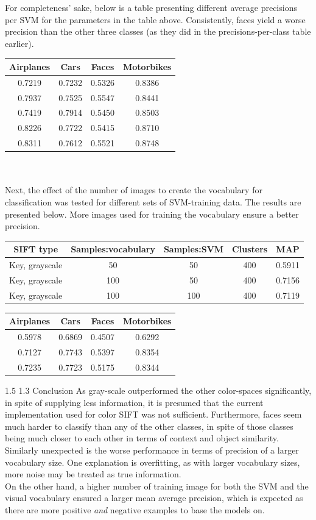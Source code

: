 \documentclass[12pt,a4paper]{amsart}
\makeatletter
\def\section{%
  \@startsection{section}{1}{\z@}%
  {1.5\linespacing\@plus\linespacing}%
  {1.3\linespacing}%
  {\bfseries\normalfont\scshape}
}
\makeatother
\begin{document}
For completeness' sake, below is a table presenting different average precisions per SVM for the parameters in the table above. Consistently, faces yield a worse precision than the other three classes (as they did in the precisions-per-class table earlier).\\
\begin{tabular}{|cccc|}
\hline
Airplanes & Cars & Faces & Motorbikes\\
\toprule
0.7219&0.7232&0.5326&0.8386\\
0.7937&0.7525&0.5547&0.8441 \\
0.7419&0.7914&0.5450&0.8503\\
0.8226&0.7722&0.5415&0.8710\\
0.8311&0.7612&0.5521&0.8748\\
\hline
\end{tabular}
\\\\Next, the effect of the number of images to create the vocabulary for classification was tested for different sets of SVM-training data. The results are presented below. More images used for training the vocabulary ensure a better precision.
\begin{tabular}{|ccccc|}
\hline
SIFT type & Samples:vocabulary & Samples:SVM & Clusters & MAP\\
\toprule
Key, grayscale & 50 & 50 & 400 & 0.5911 \\
Key, grayscale & 100 & 50 & 400 & 0.7156 \\
Key, grayscale & 100 & 100 & 400 & 0.7119 \\
\hline
\end{tabular}

\begin{tabular}{|cccc|}
\hline
Airplanes & Cars & Faces & Motorbikes\\
\toprule
0.5978&0.6869&0.4507&0.6292\\
0.7127& 0.7743& 0.5397 & 0.8354\\
0.7235 & 0.7723& 0.5175 & 0.8344\\
\hline
\end{tabular}

\section{Conclusion}
As gray-scale outperformed the other color-spaces significantly, in spite of supplying less information, it is presumed that the current implementation used for color SIFT was not sufficient.  Furthermore, faces seem much harder to classify than any of the other classes, in spite of those classes being much closer to each other in terms of context and object similarity. \\
Similarly unexpected is the worse performance in terms of precision of a larger vocabulary size. One explanation is overfitting, as with larger vocabulary sizes, more noise may be treated as true information. \\
On the other hand, a higher number of training image for both the SVM and the visual vocabulary ensured a larger mean average precision, which is expected as there are more positive \textit{and} negative examples to base the models on.
\end{document}
